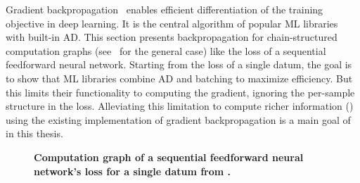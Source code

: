 Gradient backpropagation~\cite{rumelhart1986learning} enables efficient
differentiation of the training objective in deep learning. It is the central
algorithm of popular ML libraries with built-in AD. This section presents
backpropagation for chain-structured computation graphs (see~\cite[Chapter
6]{goodfellow2016deep} for the general case) like the loss of a sequential
feedforward neural network. Starting from the loss of a single datum, the goal
is to show that ML libraries combine AD and batching to maximize efficiency. But
this limits their functionality to computing the gradient, ignoring \eg the
per-sample structure in the loss. Alleviating this limitation to compute richer
information () using the existing
implementation of gradient backpropagation is a main goal of 
in this thesis.

\tikzexternalenable
\begin{figure*}[t]
  \centering \resizebox{\linewidth}{!}{ {\footnotesize
      }}
  \caption{\textbf{Computation graph of a sequential feedforward neural
      network's loss for a single datum from
      .}}\label{fig:background::neuralNetworkLoss}
\end{figure*}
\tikzexternaldisable

